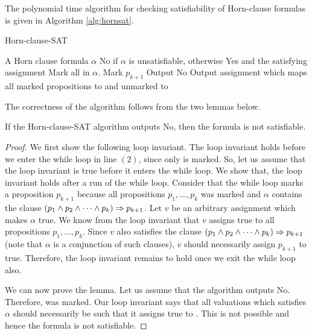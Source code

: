 The polynomial time algorithm for checking satisfiability of Horn-clause formulas is given in Algorithm \ref{alg:hornsat}.
\begin{algorithm}[h]
 \caption{Horn-clause-SAT}
 \label{alg:hornsat}
 \begin{algorithmic}[1]
 \renewcommand{\algorithmicrequire}{\textbf{Input:}}
 \renewcommand{\algorithmicensure}{\textbf{Output:}}
 \REQUIRE A Horn clause formula $\alpha$ 
 \ENSURE  No if $\alpha$ is unsatisfiable, otherwise Yes and the satisfying assignment 
  \STATE Mark all \true\/ in $\alpha$. 
  		\STATE Mark $p_{k+1}$
  \ENDWHILE
  		\STATE Output No
  	\ELSE
  		\STATE Output assignment which maps all marked propositions to \true\/ and unmarked to \false
  \ENDIF
 \end{algorithmic} 
 \end{algorithm}

The correctness of the algorithm follows from the two lemmas below. 

\begin{lemma}
If the Horn-clause-SAT algorithm outputs No, then the formula is not satisfiable.
\end{lemma}
\begin{proof}
We first show the following loop invariant.
The loop invariant holds before we enter the while loop in line $(2)$, since only \true\/ is marked. So, let us assume that the loop invariant is true before it enters the while loop. We show that, the loop invariant holds after a run of the while loop. Consider that the while loop marks a proposition $p_{k+1}$ because all propositions $p_1,\dots,p_k$ was marked and $\alpha$ contains the clause $(p_1 \wedge p_2 \wedge \dots \wedge p_k) \Rightarrow p_{k+1}$. Let $v$ be an arbitrary assignment which makes $\alpha$ true. We know from the loop invariant that $v$ assigns true to all propositions $p_1,\dots,p_k$. Since $v$ also satisfies the clause $(p_1 \wedge p_2 \wedge \dots \wedge p_k) \Rightarrow p_{k+1}$ (note that $\alpha$ is a conjunction of such clauses), $v$ should necessarily assign $p_{k+1}$ to true. Therefore, the loop invariant remains to hold once we exit the while loop also.

We can now prove the lemma. Let us assume that the algorithm outputs No. Therefore, \false\/ was marked. Our loop invariant says that all valuations which satisfies $\alpha$ should necessarily be such that it assigns true to \false\/. This is not possible and hence the formula is not satisfiable.
\end{proof}


